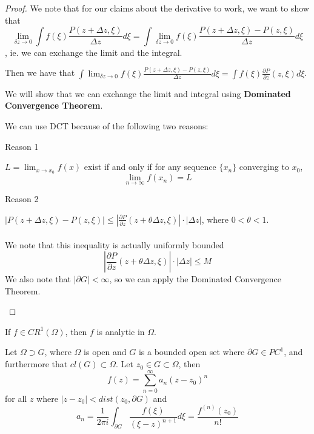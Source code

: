 \documentclass{article}
\begin{document}
\begin{proof}

We note that for our claims about the derivative to work, we want to show that
$$\lim_{\delta z \to 0} \int f(\xi) \frac{P(z + \Delta z, \xi)}{\Delta z} d\xi = \int \lim_{\delta z \to 0} f(\xi) \frac{P(z + \Delta z, \xi) - P(z, \xi)}{\Delta z} d\xi$$
, ie. we can exchange the limit and the integral.

Then we have that
$\int \lim_{\delta z \to 0} f(\xi) \frac{P(z + \Delta z, \xi) - P(z, \xi)}{\Delta z} d\xi = \int f(\xi) \frac{\partial P}{\partial z}(z, \xi) d\xi$.

We will show that we can exchange the limit and integral using \textbf{Dominated Convergence Theorem}.

We can use DCT because of the following two reasons:

Reason 1
\begin{lemma}
$L = \lim_{x \to x_0} f(x)$ exist if and only if for any sequence $\{x_n\}$ converging to $x_0$, 
\[\lim_{n \to \infty} f(x_n) = L\]
\end{lemma}

Reason 2
\begin{theorem}
$|P(z + \Delta z, \xi) - P(z, \xi)| \leq |\frac{\partial P}{\partial z}(z + \theta \Delta z, \xi)| \cdot |\Delta z|$, where $0 < \theta < 1$.\\\\
We note that this inequality is actually uniformly bounded
\[|\frac{\partial P}{\partial z}(z + \theta \Delta z, \xi)| \cdot |\Delta z| \leq M\]
We also note that $|\partial G| < \infty$, so we can apply the Dominated Convergence Theorem.
\end{theorem}
\end{proof}

\begin{theorem}
If $f \in CR^1(\Omega)$, then $f$ is analytic in $\Omega$.
\end{theorem}

\begin{theorem}
Let $\Omega \supset G$, where $\Omega$ is open and $G$ is a bounded open set where $\partial G \in PC^1$, and furthermore that $cl(G) \subset \Omega$. Let $z_0 \in G \subset \Omega$, then
$$f(z) = \sum_{n = 0}^\infty a_n (z - z_0)^n$$ for all $z$ where $|z - z_0| < dist(z_0, \partial G)$ and
\[a_n = \frac{1}{2\pi i} \int_{\partial G} \frac{f(\xi)}{(\xi - z)^{n+1}} d\xi = \frac{f^{(n)}(z_0)}{n!}\]
\end{theorem}
\end{document}
